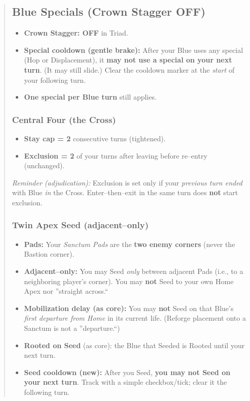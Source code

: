 \documentclass[11pt]{article}
\begin{document}
\begin{quote}
\subsection*{Blue Specials (Crown Stagger OFF)}
\begin{itemize}[leftmargin=1.3em,itemsep=0.25em]
  \item \textbf{Crown Stagger: OFF} in Triad.
  \item \textbf{Special cooldown (gentle brake):} After your Blue uses any special (Hop or Displacement), it \textbf{may not use a special on your next turn}. (It may still slide.) Clear the cooldown marker at the \emph{start} of your following turn.
  \item \textbf{One special per Blue turn} still applies.
\end{itemize}

\subsubsection*{Central Four (the Cross)}
\begin{itemize}[leftmargin=1.3em,itemsep=0.2em]
  \item \textbf{Stay cap = 2} consecutive turns (tightened).
  \item \textbf{Exclusion = 2} of your turns after leaving before re--entry (unchanged).
\end{itemize}
\noindent\emph{Reminder (adjudication):} Exclusion is set only if your \emph{previous turn ended} with Blue \emph{in} the Cross. Enter--then--exit in the same turn does \textbf{not} start exclusion.

\subsubsection*{Twin Apex Seed (adjacent--only)}
\begin{itemize}[leftmargin=1.3em,itemsep=0.25em]
  \item \textbf{Pads:} Your \emph{Sanctum Pads} are the \textbf{two enemy corners} (never the Bastion corner).
  \item \textbf{Adjacent--only:} You may Seed \emph{only} between adjacent Pads (i.e., to a neighboring player's corner). You may \textbf{not} Seed to your own Home Apex nor ''straight across.``
  \item \textbf{Mobilization delay (as core):} You may \textbf{not} Seed on that Blue's \emph{first departure from Home} in its current life. (Reforge placement onto a Sanctum is not a ''departure.``)
  \item \textbf{Rooted on Seed} (as core): the Blue that Seeded is Rooted until your next turn.
  \item \textbf{Seed cooldown (new):} After you Seed, \textbf{you may not Seed on your next turn}. Track with a simple checkbox/tick; clear it the following turn.
\end{itemize}


\end{quote}
\end{document}
